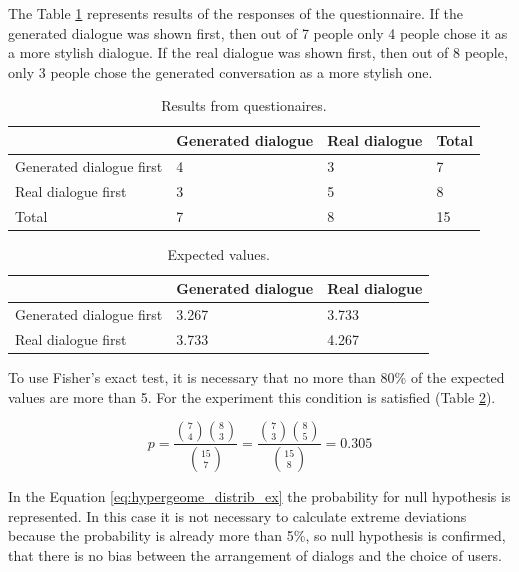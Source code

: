 The Table \ref{tab:fisher} represents results of the responses of the questionnaire. If the generated dialogue was shown first, then out of 7 people only 4 people chose it as a more stylish dialogue. If the real dialogue was shown first, then out of 8 people, only 3 people chose the generated conversation as a more stylish one.


\begin{table}[ht]
\centering
 \begin{tabular}{|p{4cm}|p{4cm}|p{3cm}|p{2cm}|} 
 \hline\hline
  & Generated dialogue & Real dialogue & Total\\
 \hline
  Generated dialogue first & 4 & 3 & 7 \\
 \hline
  Real dialogue first & 3 & 5 & 8 \\
 \hline
  Total & 7 & 8 & 15\\
 \hline\hline
 \end{tabular}
 \caption{Results from questionaires.}
\label{tab:fisher}
\end{table}

\begin{table}[ht]
\centering
 \begin{tabular}{|p{4cm}|p{4cm}|p{3cm}|} 
 \hline\hline
  & Generated dialogue & Real dialogue \\
 \hline
  Generated dialogue first & 3.267 & 3.733 \\
 \hline
  Real dialogue first & 3.733 & 4.267 \\
 \hline\hline
 \end{tabular}
 \caption{Expected values.}
\label{tab:expected_vals}
\end{table}

To use Fisher's exact test, it is necessary that no more than 80\% of the expected values are more than 5. For the experiment this condition is satisfied (Table \ref{tab:expected_vals}).

\begin{equation} \label{eq:hypergeome_distrib_ex}
p = \frac{\binom{7}{4} \binom{8}{3}}{\binom{15}{7}} = \frac{\binom{7}{3} \binom{8}{5}}{\binom{15}{8}} = 0.305
\end{equation}

In the Equation \ref{eq:hypergeome_distrib_ex} the probability for null hypothesis is represented. In this case it is not necessary to calculate extreme deviations because the probability is already more than 5\%, so null hypothesis is confirmed, that there is no bias between the arrangement of dialogs and the choice of users.

